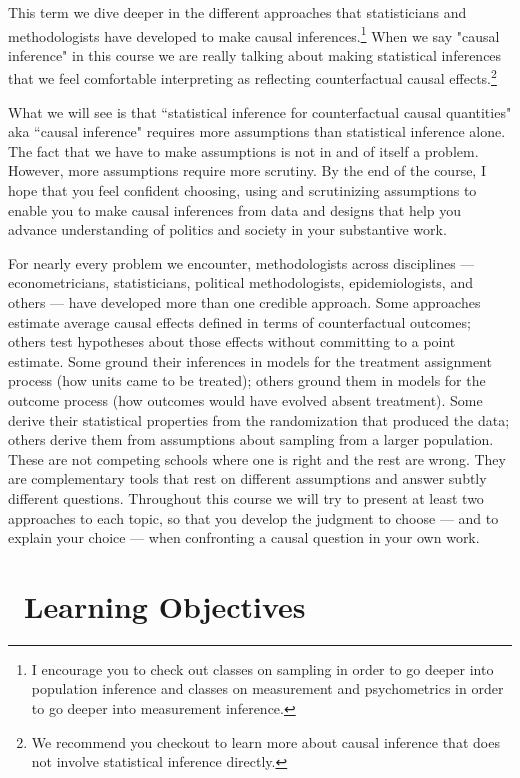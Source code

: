 \documentclass[11pt,letterpaper]{article}
\begin{document}
This term we dive deeper in the different approaches that statisticians and
methodologists have developed to make causal inferences.\footnote{I encourage
you to check out classes on sampling in order to go deeper into population
inference and classes on measurement and psychometrics in order to go deeper
into measurement inference.} When we say "causal inference" in this course we
are really talking about making statistical inferences that we feel comfortable
interpreting as reflecting counterfactual causal effects.\footnote{We recommend
you checkout  to learn more about causal inference that
does not involve statistical inference directly.}

What we will see is that ``statistical inference for counterfactual causal
quantities" aka ``causal inference" requires more assumptions than statistical
inference alone. The fact that we have to make assumptions is not in and of
itself a problem. However, more assumptions require more scrutiny. By the end
of the course, I hope that you feel confident choosing, using and scrutinizing
assumptions to enable you to make causal inferences from data and designs that
help you advance understanding of politics and society in your substantive
work.

For nearly every problem we encounter, methodologists across disciplines ---
econometricians, statisticians, political methodologists, epidemiologists,
and others --- have developed more than one credible approach. Some
approaches estimate average causal effects defined in terms of
counterfactual outcomes; others test hypotheses about those effects without
committing to a point estimate. Some ground their inferences in models for
the treatment assignment process (how units came to be treated); others
ground them in models for the outcome process (how outcomes would have
evolved absent treatment). Some derive their statistical properties from
the randomization that produced the data; others derive them from
assumptions about sampling from a larger population. These are not
competing schools where one is right and the rest are wrong. They are
complementary tools that rest on different assumptions and answer subtly
different questions. Throughout this course we will try to present at
least two approaches to each topic, so that you develop the judgment to
choose --- and to explain your choice --- when confronting a causal
question in your own work.

\section*{\faBullseye\ Learning Objectives}
\end{document}
